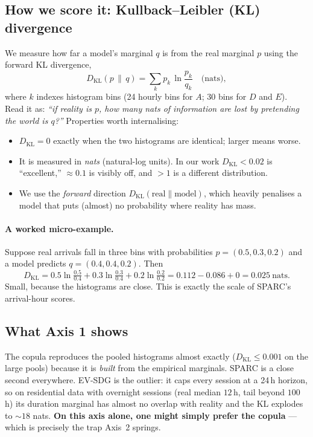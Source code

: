 \documentclass[11pt]{article}
\newcommand{\kl}{D_{\mathrm{KL}}}
\begin{document}
\subsection{How we score it: Kullback--Leibler (KL) divergence}
We measure how far a model's marginal $q$ is from the real marginal $p$ using the forward KL divergence,
\[
\kl(p\,\|\,q)=\sum_{k} p_k \,\ln\!\frac{p_k}{q_k}\quad\text{(nats)},
\]
where $k$ indexes histogram bins (24 hourly bins for $A$; 30 bins for $D$ and $E$). Read it as: \emph{``if reality is $p$, how many nats of information are lost by pretending the world is $q$?''} Properties worth internalising:
\begin{itemize}[leftmargin=1.4em,itemsep=1pt]
\item $\kl=0$ exactly when the two histograms are identical; larger means worse.
\item It is measured in \emph{nats} (natural-log units). In our work $\kl<0.02$ is ``excellent,'' $\approx0.1$ is visibly off, and $>1$ is a different distribution.
\item We use the \emph{forward} direction $\kl(\text{real}\|\text{model})$, which heavily penalises a model that puts (almost) no probability where reality has mass.
\end{itemize}

\paragraph{A worked micro-example.} Suppose real arrivals fall in three bins with probabilities $p=(0.5,0.3,0.2)$ and a model predicts $q=(0.4,0.4,0.2)$. Then
\[
\kl = 0.5\ln\tfrac{0.5}{0.4}+0.3\ln\tfrac{0.3}{0.4}+0.2\ln\tfrac{0.2}{0.2}
= 0.112-0.086+0 = 0.025\ \text{nats}.
\]
Small, because the histograms are close. This is exactly the scale of SPARC's arrival-hour scores.

\subsection{What Axis 1 shows}
The copula reproduces the pooled histograms almost exactly ($\kl\le0.001$ on the large pools) because it is \emph{built} from the empirical marginals. SPARC is a close second everywhere. EV-SDG is the outlier: it caps every session at a 24\,h horizon, so on residential data with overnight sessions (real median $12$\,h, tail beyond $100$\,h) its duration marginal has almost no overlap with reality and the KL explodes to $\sim\!18$ nats. \textbf{On this axis alone, one might simply prefer the copula} --- which is precisely the trap Axis~2 springs.
\end{document}
